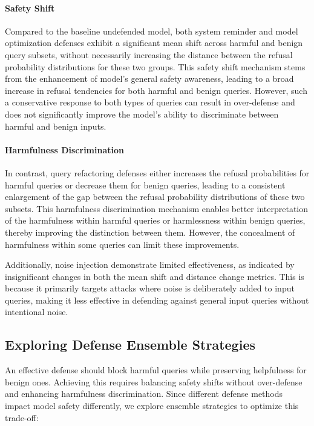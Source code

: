 \paragraph{Safety Shift} Compared to the baseline undefended model, both system reminder and model optimization defenses exhibit a significant mean shift across harmful and benign query subsets, without necessarily increasing the distance between the refusal probability distributions for these two groups.
This safety shift mechanism stems from the enhancement of model's general safety awareness, leading to a broad increase in refusal tendencies for both harmful and benign queries. However, such a conservative response to both types of queries can result in over-defense and does not significantly improve the model's ability to discriminate between harmful and benign inputs.

\paragraph{Harmfulness Discrimination} In contrast, query refactoring defenses either increases the refusal probabilities for harmful queries or decrease them for benign queries, leading to a consistent enlargement of the gap between the refusal probability distributions of these two subsets. This harmfulness discrimination mechanism enables better interpretation of the harmfulness within harmful queries or harmlessness within benign queries, thereby improving the distinction between them. However, the concealment of harmfulness within some queries can limit these improvements.

Additionally, noise injection demonstrate limited effectiveness, as indicated by insignificant changes in both the mean shift and distance change metrics. This is because it primarily targets attacks where noise is deliberately added to input queries, making it less effective in defending against general input queries without intentional noise.



\subsection{Exploring Defense Ensemble Strategies}

An effective defense should block harmful queries while preserving helpfulness for benign ones. Achieving this requires balancing safety shifts without over-defense and enhancing harmfulness discrimination. Since different defense methods impact model safety differently, we explore ensemble strategies to optimize this trade-off:

